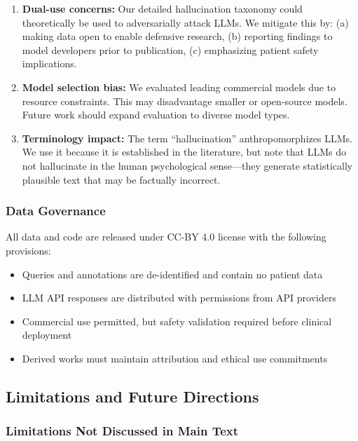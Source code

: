 \documentclass[11pt,a4paper]{article}
\begin{document}
\begin{enumerate}
    \item \textbf{Dual-use concerns:} Our detailed hallucination taxonomy could theoretically be used to adversarially attack LLMs. We mitigate this by: (a) making data open to enable defensive research, (b) reporting findings to model developers prior to publication, (c) emphasizing patient safety implications.

    \item \textbf{Model selection bias:} We evaluated leading commercial models due to resource constraints. This may disadvantage smaller or open-source models. Future work should expand evaluation to diverse model types.

    \item \textbf{Terminology impact:} The term ``hallucination'' anthropomorphizes LLMs. We use it because it is established in the literature, but note that LLMs do not hallucinate in the human psychological sense—they generate statistically plausible text that may be factually incorrect.
\end{enumerate}

\subsubsection{Data Governance}

All data and code are released under CC-BY 4.0 license with the following provisions:

\begin{itemize}
    \item Queries and annotations are de-identified and contain no patient data
    \item LLM API responses are distributed with permissions from API providers
    \item Commercial use permitted, but safety validation required before clinical deployment
    \item Derived works must maintain attribution and ethical use commitments
\end{itemize}

\subsection{Limitations and Future Directions}

\subsubsection{Limitations Not Discussed in Main Text}
\end{document}
